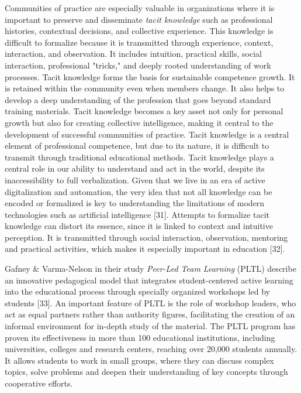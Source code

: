 Communities of practice are especially valuable in organizations where
it is important to preserve and disseminate \emph{tacit knowledge} such
as professional histories, contextual decisions, and collective
experience. This knowledge is difficult to formalize because it is
transmitted through experience, context, interaction, and observation.
It includes intuition, practical skills, social interaction,
professional "tricks," and deeply rooted understanding of work
processes. Tacit knowledge forms the basis for sustainable competence
growth. It is retained within the community even when members change. It
also helps to develop a deep understanding of the profession that goes
beyond standard training materials. Tacit knowledge becomes a key asset
not only for personal growth but also for creating collective
intelligence, making it central to the development of successful
communities of practice. Tacit knowledge is a central element of
professional competence, but due to its nature, it is difficult to
transmit through traditional educational methods. Tacit knowledge plays
a central role in our ability to understand and act in the world,
despite its inaccessibility to full verbalization. Given that we live in
an era of active digitalization and automation, the very idea that not
all knowledge can be encoded or formalized is key to understanding the
limitations of modern technologies such as artificial intelligence
{[}31{]}. Attempts to formalize tacit knowledge can distort its essence,
since it is linked to context and intuitive perception. It is
transmitted through social interaction, observation, mentoring and
practical activities, which makes it especially important in education
{[}32{]}.

Gafney \& Varma-Nelson in their study \emph{Peer-Led Team Learning}
(PLTL) describe an innovative pedagogical model that integrates
student-centered active learning into the educational process through
specially organized workshops led by students {[}33{]}. An important
feature of PLTL is the role of workshop leaders, who act as equal
partners rather than authority figures, facilitating the creation of an
informal environment for in-depth study of the material. The PLTL
program has proven its effectiveness in more than 100 educational
institutions, including universities, colleges and research centers,
reaching over 20,000 students annually. It allows students to work in
small groups, where they can discuss complex topics, solve problems and
deepen their understanding of key concepts through cooperative efforts.

